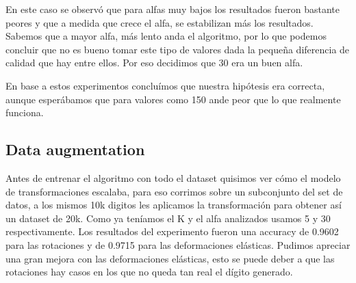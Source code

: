 En este caso se observó que para alfas muy bajos los resultados fueron bastante peores y que a medida que crece el alfa, se estabilizan más los resultados. 
Sabemos que a mayor alfa, más lento anda el algoritmo, por lo que podemos concluir que no es bueno tomar este tipo de valores dada la pequeña diferencia de calidad que hay entre ellos. Por eso decidimos que 30 era un buen alfa.

En base a estos experimentos concluímos que nuestra hipótesis era correcta, aunque esperábamos que para valores como 150 ande peor que lo que realmente funciona.

\subsection{Data augmentation}

Antes de entrenar el algoritmo con todo el dataset quisimos ver cómo el modelo de transformaciones escalaba, para eso corrimos sobre un subconjunto del set de datos, a los mismos 10k digitos les aplicamos la transformación para obtener así un dataset de 20k. Como ya teníamos el K y el alfa analizados usamos 5 y 30 respectivamente. Los resultados del experimento fueron una accuracy de 0.9602 para las rotaciones y de 0.9715 para las deformaciones elásticas. Pudimos apreciar una gran mejora con las deformaciones elásticas, esto se puede deber a que las rotaciones hay casos en los que no queda tan real el dígito generado.